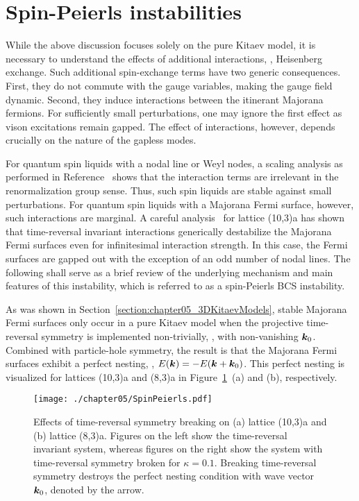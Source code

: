 %
%
\section{Spin-Peierls instabilities}
\label{section:chapter05_SpinPeierls}
%
%
While the above discussion focuses solely on the pure Kitaev model, it is necessary to understand the effects of additional interactions, \eg, Heisenberg exchange.
Such additional spin-exchange terms have two generic consequences.
First, they do not commute with the gauge variables, making the gauge field dynamic.
Second, they induce interactions between the itinerant Majorana fermions.
For sufficiently small perturbations, one may ignore the first effect as vison excitations remain gapped.
The effect of interactions, however, depends crucially on the nature of the gapless modes.

For quantum spin liquids with a nodal line or Weyl nodes, a scaling analysis as performed in Reference~\cite{LeePRB2014} shows that the interaction terms are irrelevant in the renormalization group sense.
Thus, such spin liquids are stable against small perturbations.
For quantum spin liquids with a Majorana Fermi surface, however, such interactions are marginal.
A careful analysis~\cite{HermannsPRL2015b} for lattice (10,3)a has shown that time-reversal invariant interactions generically destabilize the Majorana Fermi surfaces even for infinitesimal interaction strength.
In this case, the Fermi surfaces are gapped out with the exception of an odd number of nodal lines.
The following shall serve as a brief review of the underlying mechanism and main features of this instability, which is referred to as a spin-Peierls BCS instability.

As was shown in Section~\ref{section:chapter05_3DKitaevModels}, stable Majorana Fermi surfaces only occur in a pure Kitaev model when the projective time-reversal symmetry is implemented non-trivially, \ie, with non-vanishing $\bm{k}_0$.
Combined with particle-hole symmetry, the result is that the Majorana Fermi surfaces exhibit a perfect nesting, \ie, $E(\bm{k}) = -E(\bm{k} + \bm{k}_0)$.
This perfect nesting is visualized for lattices (10,3)a and (8,3)a in Figure~\ref{fig:chapter05_SpinPeierls}~(a) and (b), respectively.
%
\begin{figure}[tb]
	\centering
	\texttt{[image: ./chapter05/SpinPeierls.pdf]}
	\caption{
		Effects of time-reversal symmetry breaking on (a) lattice (10,3)a and (b) lattice (8,3)a.
		Figures on the left show the time-reversal invariant system, whereas figures on the right show the system with time-reversal symmetry broken for $\kappa = 0.1$.
		Breaking time-reversal symmetry destroys the perfect nesting condition with wave vector $\bm{k}_0$, denoted by the arrow.
	}
	\label{fig:chapter05_SpinPeierls}
\end{figure}
%

